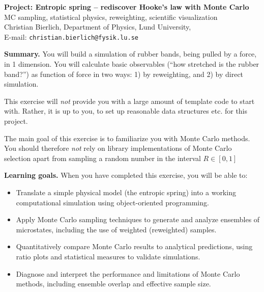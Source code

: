 \documentclass[11pt]{article}
\begin{document}
\begin{center}
  {\Large \textbf{Project: Entropic spring -- rediscover Hooke's law with Monte Carlo}}\\[6pt]
  {\large MC sampling, statistical physics, reweighting, scientific visualization}\\[4pt]
  {Christian Bierlich, Department of Physics, Lund University,}\\
  {E-mail: \texttt{christian.bierlich@fysik.lu.se}}
\end{center}

\vspace{0.75em}

\noindent\textbf{Summary.}
You will build a simulation of rubber bands, being pulled by a force, in 1 dimension. You will calculate basic observables (``how stretched is the rubber band?'') as function of force in two ways: 1) by reweighting, and 2) by direct simulation.

This exercise will \emph{not} provide you with a large amount of template code to start with. Rather, it is up to you, to set up reasonable data structures etc. for this project.

The main goal of this exercise is to familiarize you with Monte Carlo methods. You should therefore \emph{not} rely on library implementations of Monte Carlo selection apart from sampling a random number in the interval $R \in [0,1]$
\medskip

\noindent\textbf{Learning goals.}
When you have completed this exercise, you will be able to:
\begin{itemize}
  \item Translate a simple physical model (the entropic spring) into a working computational simulation using object-oriented programming.
  \item Apply Monte Carlo sampling techniques to generate and analyze ensembles of microstates, including the use of weighted (reweighted) samples.
  \item Quantitatively compare Monte Carlo results to analytical predictions, using ratio plots and statistical measures to validate simulations.
  \item Diagnose and interpret the performance and limitations of Monte Carlo methods, including ensemble overlap and effective sample size.
\end{itemize}
\end{document}
